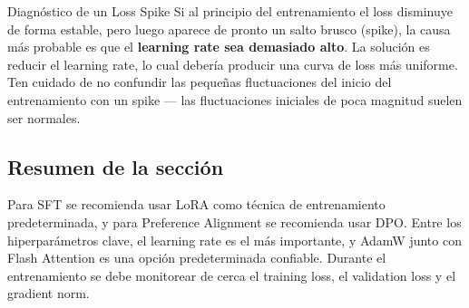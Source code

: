 \begin{warningbox}{Diagnóstico de un Loss Spike}
Si al principio del entrenamiento el loss disminuye de forma estable, pero luego aparece de pronto un salto brusco (spike), la causa más probable es que el \textbf{learning rate sea demasiado alto}. La solución es reducir el learning rate, lo cual debería producir una curva de loss más uniforme. Ten cuidado de no confundir las pequeñas fluctuaciones del inicio del entrenamiento con un spike — las fluctuaciones iniciales de poca magnitud suelen ser normales.
\end{warningbox}

\subsection{Resumen de la sección}

Para SFT se recomienda usar LoRA como técnica de entrenamiento predeterminada, y para Preference Alignment se recomienda usar DPO. Entre los hiperparámetros clave, el learning rate es el más importante, y AdamW junto con Flash Attention es una opción predeterminada confiable. Durante el entrenamiento se debe monitorear de cerca el training loss, el validation loss y el gradient norm.

\newpage

